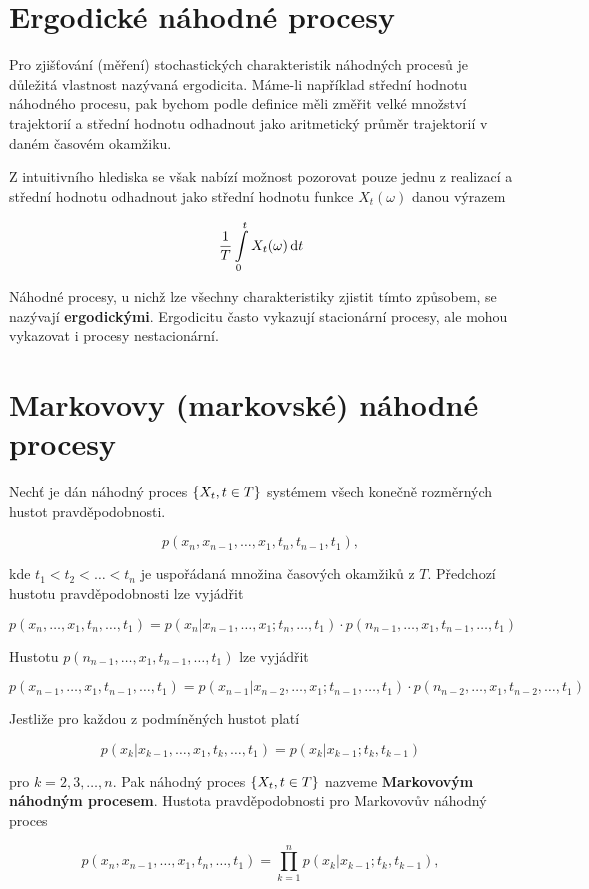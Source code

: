 \section{Ergodické náhodné procesy}
Pro zjišťování (měření) stochastických charakteristik náhodných procesů je důležitá vlastnost nazývaná ergodicita. Máme-li například střední hodnotu náhodného procesu, pak bychom podle definice měli změřit velké množství trajektorií a střední hodnotu odhadnout jako aritmetický průměr trajektorií v daném časovém okamžiku.\br

Z intuitivního hlediska se však nabízí možnost pozorovat pouze jednu z realizací a střední hodnotu odhadnout jako střední hodnotu funkce $X_t(\omega)$ danou výrazem

\[ \frac{1}{T}\int\limits_0^t X_t(\omega)\,\mathrm{d} t \]

Náhodné procesy, u nichž lze všechny charakteristiky zjistit tímto způsobem, se nazývají \textbf{ergodickými}. Ergodicitu často vykazují stacionární procesy, ale mohou vykazovat i procesy nestacionární.

\section{Markovovy (markovské) náhodné procesy}
Nechť je dán náhodný proces $\left\{X_t,t\in T\right\}$ systémem všech konečně rozměrných hustot pravděpodobnosti.

\[ p(x_n,x_{n-1},\ldots, x_1,t_n,t_{n-1},t_1), \]

kde $t_1<t_2<\ldots<t_n$ je uspořádaná množina časových okamžiků z $T$. Předchozí hustotu pravděpodobnosti lze vyjádřit

\[ p(x_n,\ldots,x_1,t_n,\ldots,t_1) = p(x_n|x_{n-1},\ldots,x_1;t_n,\ldots,t_1)\cdot p(n_{n-1},\ldots,x_1,t_{n-1},\ldots,t_1) \]

Hustotu $p(n_{n-1},\ldots,x_1,t_{n-1},\ldots,t_1)$ lze vyjádřit 

\[ p(x_{n-1},\ldots,x_1,t_{n-1},\ldots,t_1) = p(x_{n-1}|x_{n-2},\ldots,x_1;t_{n-1},\ldots,t_1)\cdot p(n_{n-2},\ldots,x_1,t_{n-2},\ldots,t_1) \]

Jestliže pro každou z podmíněných hustot platí

\[ p(x_k|x_{k-1},\ldots,x_1,t_k,\ldots,t_1)=p(x_k|x_{k-1};t_k,t_{k-1}) \]

pro $k=2,3,\ldots,n$. Pak náhodný proces $\left\{X_t,t\in T\right\}$ nazveme \textbf{Markovovým náhodným procesem}. Hustota pravděpodobnosti pro Markovovův náhodný proces

\[ p(x_n,x_{n-1},\ldots,x_1,t_n,\ldots,t_1)=\prod_{k=1}^np(x_k|x_{k-1};t_k,t_{k-1}), \]

